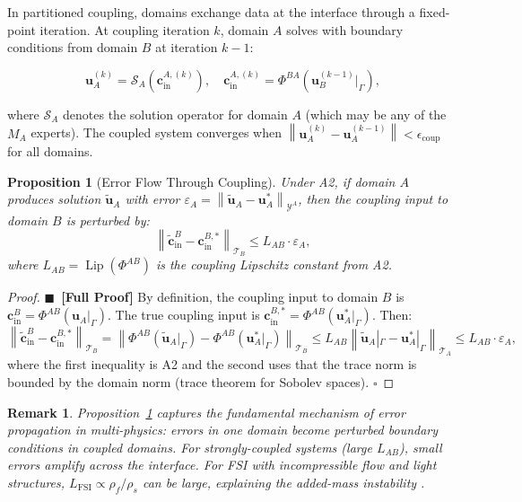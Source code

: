 \documentclass[11pt,a4paper]{article}
\newtheorem{proposition}[theorem]{Proposition}
\newtheorem{remark}[theorem]{Remark}
\theoremstyle{definition}
\newcommand{\rigorFull}[0]{$\blacksquare$~\textbf{[Full Proof]}}
\DeclareMathOperator{\Lip}{Lip}
\newcommand{\norm}[1]{\left\lVert#1\right\rVert}
\newcommand{\interface}{\Gamma}
\begin{document}
In partitioned coupling, domains exchange data at the interface through a fixed-point iteration. At coupling iteration $k$, domain $A$ solves with boundary conditions from domain $B$ at iteration $k-1$:

\begin{equation}\label{eq:coupling_iter}
\mathbf{u}_{A}^{(k)} = \mathcal{S}_A(\mathbf{c}_{\mathrm{in}}^{A, (k)}), \quad \mathbf{c}_{\mathrm{in}}^{A, (k)} = \Phi^{BA}(\mathbf{u}_B^{(k-1)}|_\interface),
\end{equation}

where $\mathcal{S}_A$ denotes the solution operator for domain $A$ (which may be any of the $M_A$ experts). The coupled system converges when $\norm{\mathbf{u}_A^{(k)} - \mathbf{u}_A^{(k-1)}} < \epsilon_{\mathrm{coup}}$ for all domains.

\begin{proposition}[Error Flow Through Coupling]\label{prop:error_flow}
Under A2, if domain $A$ produces solution $\tilde{\mathbf{u}}_A$ with error $\varepsilon_A = \norm{\tilde{\mathbf{u}}_A - \mathbf{u}_A^*}_{\mathcal{Y}^A}$, then the coupling input to domain $B$ is perturbed by:
\begin{equation}\label{eq:error_flow}
\norm{\tilde{\mathbf{c}}_{\mathrm{in}}^B - \mathbf{c}_{\mathrm{in}}^{B,*}}_{\mathcal{T}_B} \leq L_{AB} \cdot \varepsilon_A,
\end{equation}
where $L_{AB} = \Lip(\Phi^{AB})$ is the coupling Lipschitz constant from A2.
\end{proposition}

\begin{proof}\rigorFull
By definition, the coupling input to domain $B$ is $\mathbf{c}_{\mathrm{in}}^B = \Phi^{AB}(\mathbf{u}_A|_\interface)$. The true coupling input is $\mathbf{c}_{\mathrm{in}}^{B,*} = \Phi^{AB}(\mathbf{u}_A^*|_\interface)$. Then:
\begin{equation}
\norm{\tilde{\mathbf{c}}_{\mathrm{in}}^B - \mathbf{c}_{\mathrm{in}}^{B,*}}_{\mathcal{T}_B} = \norm{\Phi^{AB}(\tilde{\mathbf{u}}_A|_\interface) - \Phi^{AB}(\mathbf{u}_A^*|_\interface)}_{\mathcal{T}_B} \leq L_{AB} \norm{\tilde{\mathbf{u}}_A|_\interface - \mathbf{u}_A^*|_\interface}_{\mathcal{T}_A} \leq L_{AB} \cdot \varepsilon_A,
\end{equation}
where the first inequality is A2 and the second uses that the trace norm is bounded by the domain norm (trace theorem for Sobolev spaces). $\square$
\end{proof}

\begin{remark}
Proposition~\ref{prop:error_flow} captures the fundamental mechanism of error propagation in multi-physics: errors in one domain become perturbed boundary conditions in coupled domains. For strongly-coupled systems (large $L_{AB}$), small errors amplify across the interface. For FSI with incompressible flow and light structures, $L_{\mathrm{FSI}} \propto \rho_f / \rho_s$ can be large, explaining the added-mass instability \cite{Causin2005}.
\end{remark}
\end{document}
